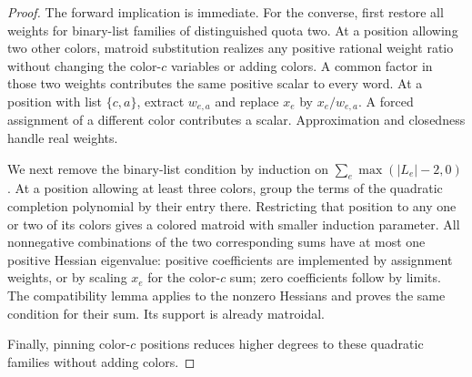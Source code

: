 \begin{proof}
The forward implication is immediate. For the converse, first restore
all weights for binary-list families of distinguished quota two.
At a position allowing two other colors, matroid substitution realizes
any positive rational weight ratio without changing the color-$c$
variables or adding colors. A common factor in those two weights contributes
the same positive scalar to every word.
At a position with list $\{c,a\}$, extract $w_{e,a}$ and replace
$x_e$ by $x_e/w_{e,a}$. A forced assignment of a different color
contributes a scalar. Approximation and closedness handle real weights.

We next remove the binary-list condition by induction on
$\sum_e\max(|L_e|-2,0)$. At a position allowing at least three colors,
group the terms of the quadratic completion polynomial by their entry there.
Restricting that position to any one or two of its colors gives
a colored matroid with smaller induction parameter. All nonnegative
combinations of the two corresponding sums have at most one positive
Hessian eigenvalue: positive coefficients are implemented by assignment
weights, or by scaling $x_e$ for the color-$c$ sum;
zero coefficients follow by limits. The compatibility lemma applies
to the nonzero Hessians and proves the same condition for
their sum. Its support is already matroidal.

Finally, pinning color-$c$ positions reduces higher degrees to these
quadratic families without adding colors.
\end{proof}
